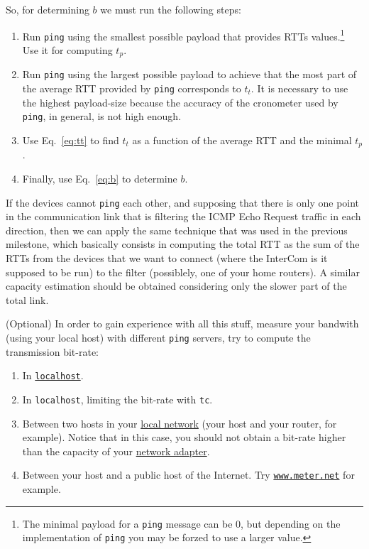 So, for determining $b$ we must run the following steps:
\begin{enumerate}
\item Run \texttt{ping} using the smallest possible payload that
  provides RTTs values.\footnote{The minimal payload for a
    \texttt{ping} message can be 0, but depending on the
    implementation of \texttt{ping} you may be forzed to use a larger
    value.} Use it for computing $t_p$.
  
\item Run \texttt{ping} using the largest possible payload to achieve
  that the most part of the average RTT provided by \texttt{ping}
  corresponds to $t_t$. It is necessary to use the highest
  payload-size because the accuracy of the cronometer used by
  \texttt{ping}, in general, is not high enough.
  
\item Use Eq.~\ref{eq:tt} to find $t_t$ as a function of the average
  RTT and the minimal $t_p$.
  
\item Finally, use Eq.~\ref{eq:b} to determine $b$.
\end{enumerate}

If the devices cannot \texttt{ping} each other, and supposing that
there is only one point in the communication link that is filtering
the ICMP Echo Request traffic in each direction, then we can apply the
same technique that was used in the previous milestone, which
basically consists in computing the total RTT as the sum of the RTTs
from the devices that we want to connect (where the InterCom is it
supposed to be run) to the filter (possiblely, one of your home
routers). A similar capacity estimation should be obtained considering
only the slower part of the total link.

(Optional) In order to gain experience with all this stuff, measure
your bandwith (using your local host) with different \texttt{ping}
servers, try to compute the transmission bit-rate:
\begin{enumerate}
\item In \href{https://en.wikipedia.org/wiki/Localhost}{\texttt{localhost}}.
\item In \texttt{localhost}, limiting the bit-rate with \texttt{tc}.
\item Between two hosts in your
  \href{https://en.wikipedia.org/wiki/Local_area_network}{local
    network} (your host and your router, for example). Notice that in
  this case, you should not obtain a bit-rate higher than the capacity
  of your
  \href{https://en.wikipedia.org/wiki/Network_interface_controller}{network
    adapter}.
\item Between your host and a public host of the Internet. Try
  \href{https://www.meter.net/}{\texttt{www.meter.net}} for example.
\end{enumerate}

